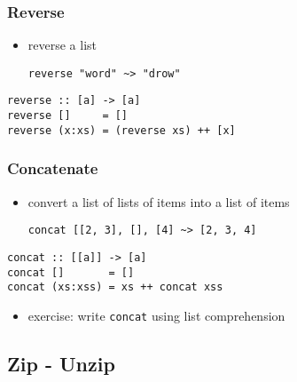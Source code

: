 \documentclass[dvipsnames]{beamer}
\theoremstyle{plain}
\begin{document}
\begin{frame}[fragile]
  \frametitle{Reverse}

  \begin{itemize}
    \item reverse a list
    \begin{lstlisting}[frame=none]
reverse "word" ~> "drow"
    \end{lstlisting}
  \end{itemize}

  \pause
  \begin{exampleblock}{}
    \begin{lstlisting}[deletekeywords={reverse}]
reverse :: [a] -> [a]
reverse []     = []
reverse (x:xs) = (reverse xs) ++ [x]
    \end{lstlisting}
  \end{exampleblock}
\end{frame}

\begin{frame}[fragile]
  \frametitle{Concatenate}

  \begin{itemize}
    \item convert a list of lists of items into a list of items
    \begin{lstlisting}[frame=none]
concat [[2, 3], [], [4] ~> [2, 3, 4]
    \end{lstlisting}
  \end{itemize}

  \pause
  \begin{exampleblock}{}
    \begin{lstlisting}[deletekeywords={concat}]
concat :: [[a]] -> [a]
concat []       = []
concat (xs:xss) = xs ++ concat xss
    \end{lstlisting}
  \end{exampleblock}

  \pause
  \begin{itemize}
    \item exercise: write \lstinline|concat| using list comprehension
  \end{itemize}
\end{frame}

\subsection{Zip - Unzip}
\end{document}
